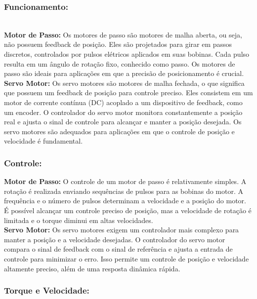 \documentclass[a4paper, 12pt]{article}
\begin{document}
\subsubsection{Funcionamento:}\\
\textbf{Motor de Passo:} Os motores de passo são motores de malha aberta, ou seja, não possuem feedback de posição. Eles são projetados para girar em passos discretos, controlados por pulsos elétricos aplicados em suas bobinas. Cada pulso resulta em um ângulo de rotação fixo, conhecido como passo. Os motores de passo são ideais para aplicações em que a precisão de posicionamento é crucial.\\

\textbf{Servo Motor:} Os servo motores são motores de malha fechada, o que significa que possuem um feedback de posição para controle preciso. Eles consistem em um motor de corrente contínua (DC) acoplado a um dispositivo de feedback, como um encoder. O controlador do servo motor monitora constantemente a posição real e ajusta o sinal de controle para alcançar e manter a posição desejada. Os servo motores são adequados para aplicações em que o controle de posição e velocidade é fundamental.\\

\subsubsection{Controle:}

\textbf{Motor de Passo:} O controle de um motor de passo é relativamente simples. A rotação é realizada enviando sequências de pulsos para as bobinas do motor. A frequência e o número de pulsos determinam a velocidade e a posição do motor. É possível alcançar um controle preciso de posição, mas a velocidade de rotação é limitada e o torque diminui em altas velocidades.\\

\textbf{Servo Motor:} Os servo motores exigem um controlador mais complexo para manter a posição e a velocidade desejadas. O controlador do servo motor compara o sinal de feedback com o sinal de referência e ajusta a entrada de controle para minimizar o erro. Isso permite um controle de posição e velocidade altamente preciso, além de uma resposta dinâmica rápida.\\

\subsubsection{Torque e Velocidade:}
\end{document}

